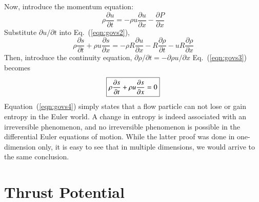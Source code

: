 \documentclass{warpdoc}
\numberwithin{equation}{section}
\newcommand{\mfd}{\displaystyle}
\newcommand\frameeqn[1]{\fbox{$#1$}}
\begin{document}
Now, introduce the momentum equation:
%
\begin{equation}
  \rho \frac{\partial u}{\partial t}=-\rho u \frac{\partial u}{\partial x}
         - \frac{\partial P}{\partial x}
\end{equation}
%
Substitute $\partial u / \partial t$ into Eq.~(\ref{eqn:govs2}),
%
\begin{equation}
  \rho \frac{\partial s}{\partial t}+ \rho u \frac{\partial s}{\partial x}
   = - \rho R \frac{\partial u}{\partial x} - R \frac{\partial \rho}{\partial t}
     - u R \frac{\partial \rho}{\partial x}
  \label{eqn:govs3}
\end{equation}
%
Then, introduce the continuity equation, $\partial \rho /\partial t = -\partial \rho u / \partial x$
Eq.~(\ref{eqn:govs3}) becomes
%
\begin{equation}
 \frameeqn{
  \mfd\rho \frac{\partial s}{\partial t}+ \rho u \frac{\partial s}{\partial x}=0
 }
  \label{eqn:govs4}
\end{equation}
%
Equation~(\ref{eqn:govs4}) simply states that a flow particle can not
lose or gain entropy in the Euler world. A change in entropy is indeed
associated with an irreversible phenomenon, and no irreversible phenomenon
is possible in the differential Euler equations of motion.
While the latter proof was done in one-dimension only, it is easy to see
that in multiple dimensions, we would arrive to the same conclusion.



\section{Thrust Potential}
\end{document}
